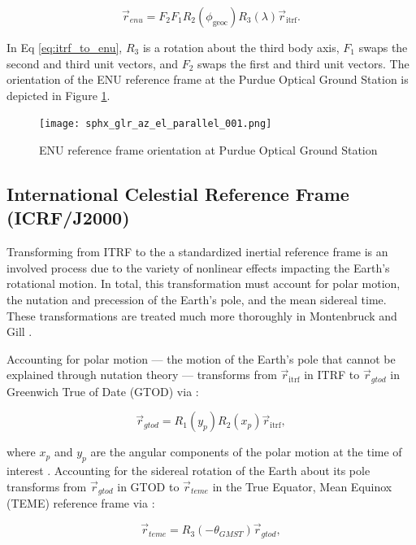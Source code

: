 \begin{equation} \label{eq:itrf_to_enu}
  \vec{r}_{enu} = F_2 F_1 R_2(\phi_\mathrm{geoc}) R_3(\lambda) \vec{r}_\mathrm{itrf}.
\end{equation}

In Eq \ref{eq:itrf_to_enu}, $R_3$ is a rotation about the third body axis, $F_1$ swaps the second and third unit vectors, and $F_2$ swaps the first and third unit vectors. The orientation of the ENU reference frame at the Purdue Optical Ground Station is depicted in Figure \ref{fig:pogs_enu}.

\begin{figure}[ht]
  \centering
  \texttt{[image: sphx\_glr\_az\_el\_parallel\_001.png]}
  \caption{ENU reference frame orientation at Purdue Optical Ground Station}
  \label{fig:pogs_enu}
\end{figure}

\subsection{International Celestial Reference Frame (ICRF/J2000)}

Transforming from ITRF to the a standardized inertial reference frame is an involved process due to the variety of nonlinear effects impacting the Earth's rotational motion. In total, this transformation must account for polar motion, the nutation and precession of the Earth's pole, and the mean sidereal time. These transformations are treated much more thoroughly in Montenbruck and Gill \cite{montenbruck2012}. 

Accounting for polar motion --- the motion of the Earth's pole that cannot be explained through nutation theory --- transforms from $\vec{r}_\mathrm{itrf}$ in ITRF to $\vec{r}_{gtod}$ in Greenwich True of Date (GTOD) via \cite{vallado4ed}:

\begin{equation} \label{eq:itrf_to_gtod}
  \vec{r}_{gtod} = R_1(y_p) R_2(x_p) \vec{r}_\mathrm{itrf},
\end{equation}

where $x_p$ and $y_p$ are the angular components of the polar motion at the time of interest \cite{frueh2019notes}. Accounting for the sidereal rotation of the Earth about its pole transforms from $\vec{r}_{gtod}$ in GTOD to $\vec{r}_{teme}$ in the True Equator, Mean Equinox (TEME) reference frame via \cite{frueh2019notes}:

\begin{equation} \label{eq:gtod_to_teme}
  \vec{r}_{teme} = R_3(-\theta_{GMST}) \vec{r}_{gtod},
\end{equation}

